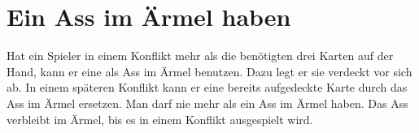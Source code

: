 \section{Ein Ass im Ärmel haben}
Hat ein Spieler in einem Konflikt mehr als die benötigten drei Karten auf der Hand, kann er eine als Ass im Ärmel benutzen. Dazu legt er sie verdeckt vor sich ab. In einem späteren Konflikt kann er eine bereits aufgedeckte Karte durch das Ass im Ärmel ersetzen. Man darf nie mehr als ein Ass im Ärmel haben. Das Ass verbleibt im Ärmel, bis es in einem Konflikt ausgespielt wird.
